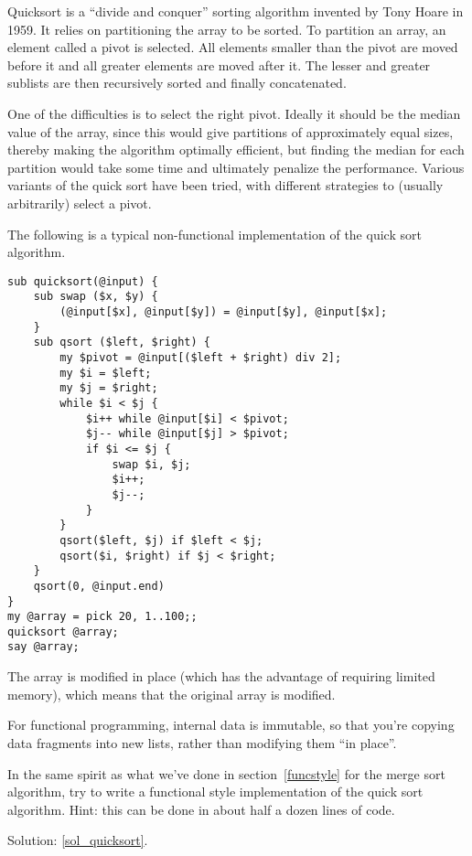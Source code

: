\begin{exercise}
Quicksort is a ``divide and conquer'' sorting algorithm invented 
by Tony Hoare in 1959. It relies on partitioning the array 
to be sorted. To partition an array, an element called a pivot 
is selected. All elements smaller than the pivot are moved before 
it and all greater elements are moved after it. The lesser and 
greater sublists are then recursively sorted and finally 
concatenated.

One of the difficulties is to select the right pivot. Ideally 
it should be the median value of the array, since this would 
give partitions of approximately equal sizes, thereby making 
the algorithm optimally efficient, but finding the 
median for each partition would take some time and ultimately 
penalize the performance. Various variants of the quick sort 
have been tried, with different strategies to (usually 
arbitrarily) select a pivot.

The following is a typical non-functional implementation 
of the quick sort algorithm.

\begin{verbatim}
sub quicksort(@input) {
    sub swap ($x, $y) {
        (@input[$x], @input[$y]) = @input[$y], @input[$x];
    }
    sub qsort ($left, $right) {
        my $pivot = @input[($left + $right) div 2];
        my $i = $left;
        my $j = $right;
        while $i < $j {
            $i++ while @input[$i] < $pivot;
            $j-- while @input[$j] > $pivot;
            if $i <= $j {
                swap $i, $j;
                $i++;
                $j--;
            }
        }
        qsort($left, $j) if $left < $j;
        qsort($i, $right) if $j < $right;
    }
    qsort(0, @input.end)
}
my @array = pick 20, 1..100;;
quicksort @array;
say @array;
\end{verbatim}

The array is modified in place (which has the advantage of 
requiring limited memory), which means that the original array 
is modified. 

For functional programming, internal data is immutable, so that 
you're copying data fragments into new lists, rather than modifying 
them ``in place''.

In the same spirit as what we've done in section~\ref{funcstyle} 
for the merge sort algorithm, try to write a functional style 
implementation of the quick sort algorithm. Hint: this can be 
done in about half a dozen lines of code. 

Solution: \ref{sol_quicksort}.

\end{exercise}

